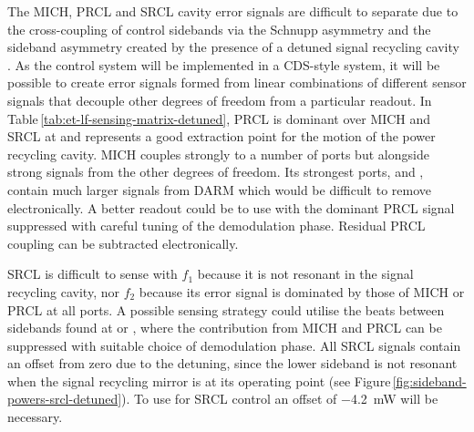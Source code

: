 The \gls{MICH}, \gls{PRCL} and \gls{SRCL} cavity error signals are difficult to separate due to the cross-coupling of control sidebands via the Schnupp asymmetry and the sideband asymmetry created by the presence of a detuned signal recycling cavity \cite{Hild2007}. As the control system will be implemented in a \LIGO{} \gls{CDS}-style system, it will be possible to create error signals formed from linear combinations of different sensor signals that decouple other degrees of freedom from a particular readout. In Table\,\ref{tab:et-lf-sensing-matrix-detuned}, \gls{PRCL} is dominant over \gls{MICH} and \gls{SRCL} at \POPFIRST{} and represents a good extraction point for the motion of the power recycling cavity. \gls{MICH} couples strongly to a number of ports but alongside strong signals from the other degrees of freedom. Its strongest ports, \ASDC{} and \ASSECOND{}, contain much larger signals from \gls{DARM} which would be difficult to remove electronically. A better readout could be to use \POPSECOND{} with the dominant \gls{PRCL} signal suppressed with careful tuning of the demodulation phase. Residual \gls{PRCL} coupling can be subtracted electronically.

\gls{SRCL} is difficult to sense with $f_1$ because it is not resonant in the signal recycling cavity, nor $f_2$ because its error signal is dominated by those of \gls{MICH} or \gls{PRCL} at all ports. A possible sensing strategy could utilise the beats between sidebands found at \REFLDIFF{} or \REFLSUM{}, where the contribution from \gls{MICH} and \gls{PRCL} can be suppressed with suitable choice of demodulation phase. All \gls{SRCL} signals contain an offset from zero due to the detuning, since the lower sideband is not resonant when the signal recycling mirror is at its operating point (see Figure\,\ref{fig:sideband-powers-srcl-detuned}). To use \REFLSUM{} for \gls{SRCL} control an offset of \SI{-4.2}{\milli\watt} will be necessary.


